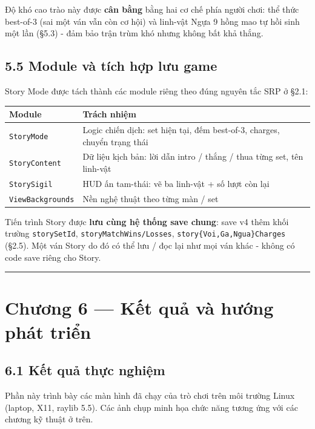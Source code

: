 \documentclass[11pt,a4paper]{article}
\begin{document}
Độ khó cao trào này được \textbf{cân bằng} bằng hai cơ chế phía người chơi: thể thức best-of-3 (sai một ván vẫn còn cơ hội) và linh-vật Ngựa 9 hồng mao tự hồi sinh một lần (§5.3) - đảm bảo trận trùm khó nhưng không bất khả thắng.

\subsection{5.5 Module và tích hợp lưu game}
\label{sec:story-modules}

Story Mode được tách thành các module riêng theo đúng nguyên tắc SRP ở §2.1:

\begin{center}
\begin{tabularx}{\textwidth}{lX}
Module & Trách nhiệm\\
\hline
\texttt{StoryMode} & Logic chiến dịch: set hiện tại, đếm best-of-3, charges, chuyển trạng thái\\
\texttt{StoryContent} & Dữ liệu kịch bản: lời dẫn intro / thắng / thua từng set, tên linh-vật\\
\texttt{StorySigil} & HUD ấn tam-thái: vẽ ba linh-vật + số lượt còn lại\\
\texttt{ViewBackgrounds} & Nền nghệ thuật theo từng màn / set\\
\end{tabularx}
\end{center}

Tiến trình Story được \textbf{lưu cùng hệ thống save chung}: save v4 thêm khối trường \texttt{storySetId}, \texttt{storyMatchWins/Losses}, \texttt{story\{Voi,Ga,Ngua\}Charges} (§2.5). Một ván Story do đó có thể lưu / đọc lại như mọi ván khác - không có code save riêng cho Story.

\noindent\rule{\textwidth}{0.5pt}
\section{Chương 6 — Kết quả và hướng phát triển}
\label{sec:org77ca5ac}

\subsection{6.1 Kết quả thực nghiệm}
\label{sec:org9c08555}

Phần này trình bày các màn hình đã chạy của trò chơi trên môi trường Linux (laptop, X11, raylib 5.5). Các ảnh chụp minh họa chức năng tương ứng với các chương kỹ thuật ở trên.
\end{document}
